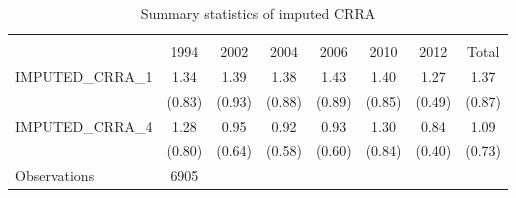 \begin{table}[htbp]\centering \caption{Summary statistics of imputed CRRA} \begin{tabular}{l*{7}{c}} \hline\hline
                    &\multicolumn{7}{c}{}                                                                      \\
                    &        1994&        2002&        2004&        2006&        2010&        2012&       Total\\
\hline
IMPUTED\_CRRA\_1      &        1.34&        1.39&        1.38&        1.43&        1.40&        1.27&        1.37\\
                    &      (0.83)&      (0.93)&      (0.88)&      (0.89)&      (0.85)&      (0.49)&      (0.87)\\
[1em]
IMPUTED\_CRRA\_4      &        1.28&        0.95&        0.92&        0.93&        1.30&        0.84&        1.09\\
                    &      (0.80)&      (0.64)&      (0.58)&      (0.60)&      (0.84)&      (0.40)&      (0.73)\\
\hline
Observations        &        6905&            &            &            &            &            &            \\
\hline\hline
\end{tabular}
\end{table}
